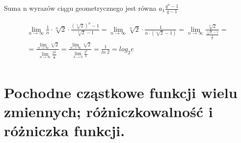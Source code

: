 \documentclass[main.tex]{subfiles}
\begin{document}
    Suma n wyrazów ciągu geometrycznego jest równa $a_1 \frac{q^n - 1}{q - 1}$

    \begin{gather*}
        \lim_{n \rightarrow \infty} \frac{1}{n} \cdot \sqrt[n]{2} \cdot \frac{(\sqrt[n]{2})^n - 1}{\sqrt[n]{2} - 1} =
        \lim_{n \rightarrow \infty} \sqrt[n]{2} \cdot \frac{1}{n \cdot (\sqrt[n]{2} - 1)} =
        \lim_{n \rightarrow \infty} \frac{\sqrt[n]{2}}{\frac{\sqrt[n]{2} - 1}{\frac{1}{n}}} =\\
        = \frac{\lim_{n \rightarrow \infty} \sqrt[n]{2}}{\lim_{n \rightarrow \infty} \frac{2^{\frac{1}{n}}}{\frac{1}{n}}} =
        \frac{\lim_{n \rightarrow \infty} \sqrt[n]{2}}{\lim_{k \rightarrow 0} \frac{2^{k}}{k}} =
        \frac{1}{ln\; 2} = log_2 e\\
    \end{gather*}
    \newpage

    \section{Pochodne cząstkowe funkcji wielu zmiennych; różniczkowalność i różniczka funkcji.}
\end{document}
